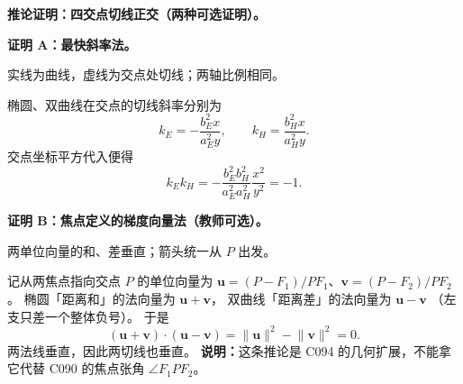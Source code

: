 \clearpage
\begin{proofbox}
\textbf{推论证明：四交点切线正交（两种可选证明）。}

\textbf{证明 A：最快斜率法。}

\begin{center}


{\small 实线为曲线，虚线为交点处切线；两轴比例相同。}
\end{center}

椭圆、双曲线在交点的切线斜率分别为
\[
k_E=-\frac{b_E^2x}{a_E^2y},\qquad
k_H=\frac{b_H^2x}{a_H^2y}.
\]
交点坐标平方代入便得
\[
k_Ek_H=-\frac{b_E^2b_H^2}{a_E^2a_H^2}
\frac{x^2}{y^2}=-1.
\]

\end{proofbox}
\clearpage
\begin{proofbox}
\textbf{证明 B：焦点定义的梯度向量法（教师可选）。}

\begin{center}


{\small 两单位向量的和、差垂直；箭头统一从 $P$ 出发。}
\end{center}

记从两焦点指向交点 $P$ 的单位向量为
$\mathbf u=(P-F_1)/PF_1$、$\mathbf v=(P-F_2)/PF_2$。
椭圆「距离和」的法向量为 $\mathbf u+\mathbf v$，
双曲线「距离差」的法向量为 $\mathbf u-\mathbf v$
（左支只差一个整体负号）。
于是
\[
(\mathbf u+\mathbf v)\cdot(\mathbf u-\mathbf v)
=\lVert\mathbf u\rVert^2-\lVert\mathbf v\rVert^2=0.
\]
两法线垂直，因此两切线也垂直。
\textbf{说明：}这条推论是 C094 的几何扩展，不能拿它代替
C090 的焦点张角 $\angle F_1PF_2$。
\end{proofbox}
